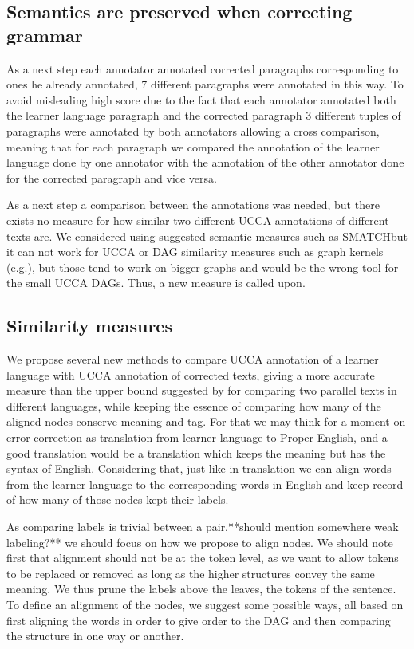 \documentclass[11pt]{article}
\begin{document}
\subsection{Semantics are preserved when correcting grammar}

As a next step each annotator annotated corrected paragraphs corresponding
to ones he already annotated, 7 different paragraphs were annotated
in this way. To avoid misleading high score due to the fact that each
annotator annotated both the learner language paragraph and the corrected
paragraph 3 different tuples of paragraphs were annotated by both
annotators allowing a cross comparison, meaning that for each paragraph
we compared the annotation of the learner language done by one annotator
with the annotation of the other annotator done for the corrected
paragraph and vice versa. 

As a next step a comparison between the annotations was needed, but
there exists no measure for how similar two different UCCA annotations
of different texts are. We considered using suggested semantic measures
such as SMATCH\cite{cai2013smatch}but it can not work for UCCA or
DAG similarity measures such as graph kernels (e.g.\cite{kashima2003marginalized}),
but those tend to work on bigger graphs and would be the wrong tool
for the small UCCA DAGs. Thus, a new measure is called upon.

\subsection{Similarity measures\label{subsec:Similarity-measures}}

We propose several new methods to compare UCCA annotation of a learner\\
language with UCCA annotation of corrected texts, giving a more accurate
measure than the upper bound suggested by \cite{sulem2015conceptual}for
comparing two parallel texts in different languages, while keeping
the essence of comparing how many of the aligned nodes conserve meaning
and tag. For that we may think for a moment on error correction as
translation from learner language to Proper English, and a good translation
would be a translation which keeps the meaning but has the syntax
of English. Considering that, just like in translation we can align
words from the learner language to the corresponding words in English
and keep record of how many of those nodes kept their labels.

As comparing labels is trivial between a pair,{*}{*}should mention
somewhere weak labeling?{*}{*} we should focus on how we propose to
align nodes. We should note first that alignment should not be at
the token level, as we want to allow tokens to be replaced or removed
as long as the higher structures convey the same meaning. We thus
prune the labels above the leaves, the tokens of the sentence. To
define an alignment of the nodes, we suggest some possible ways, all
based on first aligning the words in order to give order to the DAG
and then comparing the structure in one way or another.
\end{document}
